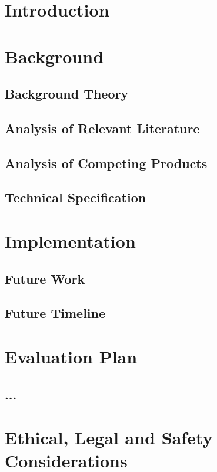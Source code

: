 \documentclass[12pt,oneside]{report}
\begin{document}


\tableofcontents
\newpage

\chapter{Introduction}



\chapter{Background}

\section{Background Theory}


\section{Analysis of Relevant Literature} \label{BackgroundLit}


\section{Analysis of Competing Products}

\section{Technical Specification}



\chapter{Implementation}

\section{Future Work} \label{FuturePlanning}
\pagebreak
\section{Future Timeline} \label{timeline}

\pagebreak

\chapter{Evaluation Plan}
\section{...}

\chapter{Ethical, Legal and Safety Considerations}



\newpage
\nocite{*}

\end{document}
